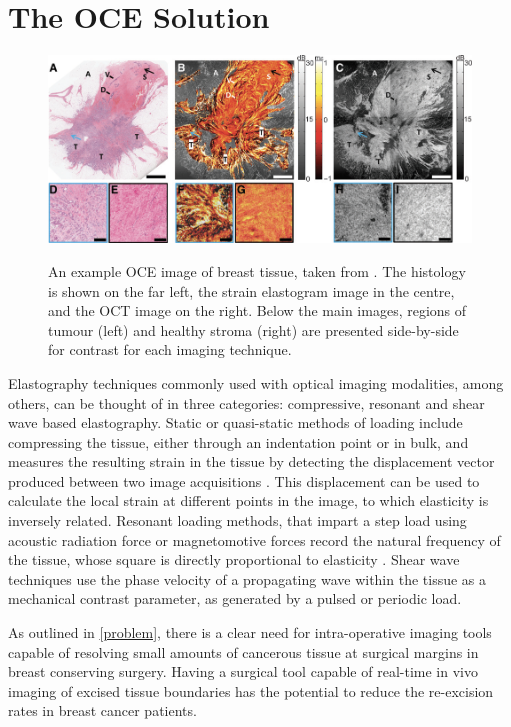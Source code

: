 \section{The OCE Solution}\label{solution}
\begin{figure}
	\centering
    \includegraphics[width=\textwidth]{figures/oce_example.png}
    \label{oce_example}
    \caption{An example OCE image of breast tissue, taken from \cite{kennedy_investigation_2015}. The histology is shown on the far left, the strain elastogram image in the centre, and the OCT image on the right. Below the main images, regions of tumour (left) and healthy stroma (right) are presented side-by-side for contrast for each imaging technique.}
\end{figure}

Elastography techniques commonly used with optical imaging modalities, among others, can be thought of in three categories: compressive, resonant and shear wave based elastography. Static or quasi-static methods of loading include compressing the tissue, either through an indentation point or in bulk, and measures the resulting strain in the tissue by detecting the displacement vector produced between two image acquisitions \cite{kennedy_optical_2014}. This displacement can be used to calculate the local strain at different points in the image, to which elasticity is inversely related. Resonant loading methods, that impart a step load using acoustic radiation force or magnetomotive forces record the natural frequency of the tissue, whose square is directly proportional to elasticity \cite{kennedy_optical_2015}. Shear wave techniques use the phase velocity of a propagating wave within the tissue as a mechanical contrast parameter, as generated by a pulsed or periodic load. 

As outlined in \autoref{problem}, there is a clear need for intra-operative imaging tools capable of resolving small amounts of cancerous tissue at surgical margins in breast conserving surgery. Having a surgical tool capable of real-time in vivo imaging of excised tissue boundaries has the potential to reduce the re-excision rates in breast cancer patients.

